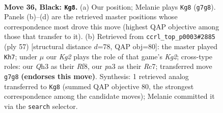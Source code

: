 \documentclass[11pt]{article}
\begin{document}
\clearpage

\begin{figure}[p]\centering
\begin{subfigure}{0.46\textwidth}\centering
\resizebox{\linewidth}{!}{%
\newchessgame
\chessboard[
  setfen={1r6/pp4k1/n5p1/2pPQbp1/8/P4Ppq/1PB4P/2RR2K1 b - - 1 36},
  showmover=false,
  pgfstyle=straightmove, color=movearrow, markmove={g7-g8}
]}
\caption{}
\end{subfigure}\hfill
\begin{subfigure}{0.46\textwidth}\centering
\resizebox{\linewidth}{!}{%
\newchessgame
\chessboard[
  setfen={5r2/2rB1pk1/p3p2p/3bQ1p1/1P1R4/3R1P1P/P5PK/2q5 b - - 5 29},
  showmover=false,
  pgfstyle=straightmove, color=movearrow, markmove={g7-h7}
]}
\caption{}
\end{subfigure}
\\[4pt]

\caption{\textbf{Move 36, Black: \texttt{Kg8}.} (a) Our position; Melanie plays \texttt{Kg8} (\texttt{g7g8}). Panels (b)--(d) are the retrieved master positions whose correspondence most drove this move (highest QAP objective among those that transfer to it). (b) Retrieved from \texttt{ccrl\_top\_p0003\#2885} (ply 57) [structural distance $d$=78, QAP obj=80]: the master played \texttt{Kh7}; under $\mu$ our \emph{Kg2} plays the role of that game's \emph{Kg2}; cross-type roles: our \emph{Q}h3 as their \emph{R}f8, our \emph{p}a3 as their \emph{R}c7; transferred move \texttt{g7g8} \textbf{(endorses this move)}. Synthesis: 1 retrieved analog transferred to \texttt{Kg8} (summed QAP objective 80, the strongest correspondence among the candidate moves); Melanie committed it via the \texttt{search} selector.}
\label{fig:thought-m71}
\end{figure}

\clearpage
\end{document}
